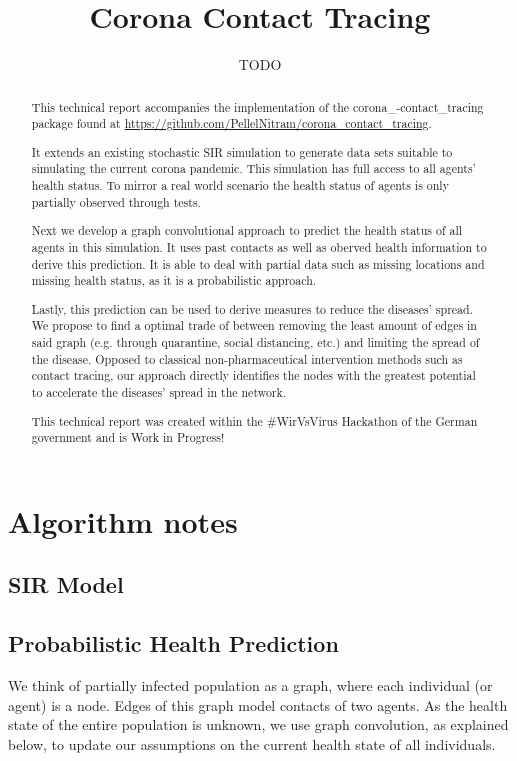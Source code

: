 \documentclass[]{article}
\title{Corona Contact Tracing}
\author{TODO}
\begin{document}
\maketitle

\begin{abstract}
	This technical report accompanies the implementation of the corona\_-contact\_tracing package found at \url{https://github.com/PellelNitram/corona_contact_tracing}.

	It extends an existing stochastic SIR simulation to generate data sets suitable to simulating the current corona pandemic.
	This simulation has full access to all agents' health status.
	To mirror a real world scenario the health status of agents is only partially observed through tests.

	Next we develop a graph convolutional approach to predict the health status of all agents in this simulation.
	It uses past contacts as well as oberved health information to derive this prediction.
	It is able to deal with partial data such as missing locations and missing health status, as it is a probabilistic approach.
	
	Lastly, this prediction can be used to derive measures to reduce the diseases' spread.
	We propose to find a optimal trade of between removing the least amount of edges in said graph (e.g. through quarantine, social distancing, etc.) and limiting the spread of the disease.
	Opposed to classical non-pharmaceutical intervention methods such as contact tracing, our approach directly identifies the nodes with the greatest potential to accelerate the diseases' spread in the network.
	
	This technical report was created within the \#WirVsVirus Hackathon of the German government and is Work in Progress!
\end{abstract}

\section{Algorithm notes}

\subsection{SIR Model}

\subsection{Probabilistic Health Prediction}
We think of partially infected population as a graph, where each individual (or agent) is a node.
Edges of this graph model contacts of two agents.
As the health state of the entire population is unknown, we use graph convolution, as explained below, to update our assumptions on the current health state of all individuals.
\end{document}
